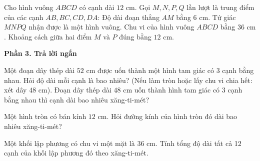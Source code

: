 \begin{ex} %
Cho hình vuông $ABCD$ có cạnh dài $12\text{ cm}$. Gọi $M, N, P, Q$ lần lượt là trung điểm của các cạnh $AB, BC, CD, DA$:
\choiceTF
{\True Độ dài đoạn thẳng $AM$ bằng $6\text{ cm}$.}
{\True Tứ giác $MNPQ$ nhận được là một hình vuông.}
{Chu vi của hình vuông $ABCD$ bằng $36\text{ cm}$.}
{\True Khoảng cách giữa hai điểm $M$ và $P$ đúng bằng $12\text{ cm}$.}
\end{ex}

\textbf{Phần 3. Trả lời ngắn}

\begin{ex} %
Một đoạn dây thép dài $52\text{ cm}$ được uốn thành một hình tam giác có 3 cạnh bằng nhau. Hỏi độ dài mỗi cạnh là bao nhiêu? (Nếu làm tròn hoặc lấy chu vi chia hết: xét dây $48\text{ cm}$). Đoạn dây thép dài $48\text{ cm}$ uốn thành hình tam giác có 3 cạnh bằng nhau thì cạnh dài bao nhiêu xăng-ti-mét?
\end{ex}

\begin{ex} %
Một hình tròn có bán kính $12\text{ cm}$. Hỏi đường kính của hình tròn đó dài bao nhiêu xăng-ti-mét?
\end{ex}

\begin{ex} %
Một khối lập phương có chu vi một mặt là $36\text{ cm}$. Tính tổng độ dài tất cả 12 cạnh của khối lập phương đó theo xăng-ti-mét.
\end{ex}

